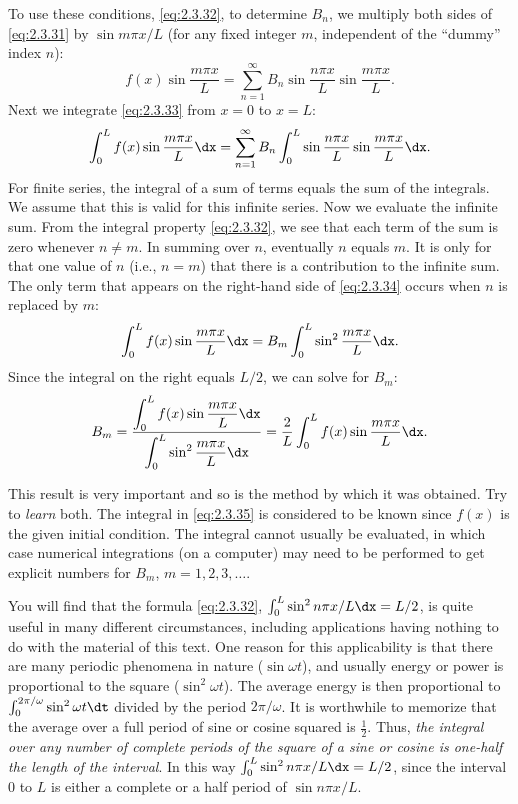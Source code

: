 To use these conditions, \eqref{eq:2.3.32}, to determine $B_n$, we multiply both sides of \eqref{eq:2.3.31} by $\sin m\pi x/L$ (for any fixed integer $m$, independent of the ``dummy'' index $n$):
\begin{equation}
\label{eq:2.3.33}
f(x)\sin\frac{m\pi x}{L} = \sum_{n=1}^{\infty} B_n \sin\frac{n\pi x}{L}\sin\frac{m\pi x}{L}.
\end{equation}
Next we integrate \eqref{eq:2.3.33} from $x = 0$ to $x = L$:
\begin{equation}
\label{eq:2.3.34}
\int_0^L f(x)\sin\frac{m\pi x}{L}\dx = \sum_{n=1}^{\infty} B_n \int_0^L \sin\frac{n\pi x}{L}\sin\frac{m\pi x}{L}\dx.
\end{equation}
For finite series, the integral of a sum of terms equals the sum of the integrals. We assume that this is valid for this infinite series. Now we evaluate the infinite sum. From the integral property \eqref{eq:2.3.32}, we see that each term of the sum is zero whenever $n \ne m$. In summing over $n$, eventually $n$ equals $m$. It is only for that one value of $n$ (i.e., $n = m$) that there is a contribution to the infinite sum. The only term that appears on the right-hand side of \eqref{eq:2.3.34} occurs when $n$ is replaced by $m$:
\[
\int_0^L f(x)\sin\frac{m\pi x}{L}\dx = B_m \int_0^L \sin^2\frac{m\pi x}{L}\dx.
\]
Since the integral on the right equals $L/2$, we can solve for $B_m$:
\begin{equation}
\label{eq:2.3.35}
B_m = \frac{\displaystyle\int_0^L f(x)\sin\frac{m\pi x}{L}\dx}{\displaystyle\int_0^L \sin^2\frac{m\pi x}{L}\dx} = \frac{2}{L}\int_0^L f(x)\sin\frac{m\pi x}{L}\dx.
\end{equation}

This result is very important and so is the method by which it was obtained. Try to \emph{learn} both. The integral in \eqref{eq:2.3.35} is considered to be known since $f(x)$ is the given initial condition. The integral cannot usually be evaluated, in which case numerical integrations (on a computer) may need to be performed to get explicit numbers for $B_m$, $m = 1, 2, 3, \ldots$.

You will find that the formula \eqref{eq:2.3.32}, $\int_0^L \sin^2 n\pi x/L\dx = L/2$, is quite useful in many different circumstances, including applications having nothing to do with the material of this text. One reason for this applicability is that there are many periodic phenomena in nature ($\sin\omega t$), and usually energy or power is proportional to the square ($\sin^2\omega t$). The average energy is then proportional to $\int_0^{2\pi/\omega}\sin^2\omega t\dt$ divided by the period $2\pi/\omega$. It is worthwhile to memorize that the average over a full period of sine or cosine squared is $\frac{1}{2}$. Thus, \emph{the integral over any number of complete periods of the square of a sine or cosine is one-half the length of the interval}. In this way $\int_0^L \sin^2 n\pi x/L\dx = L/2$, since the interval $0$ to $L$ is either a complete or a half period of $\sin n\pi x/L$.

